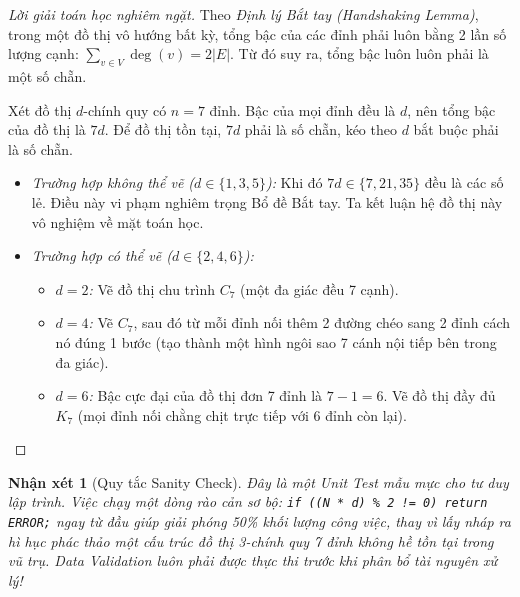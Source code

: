 \documentclass{article}
\newtheorem{nhanxet}{Nhận xét}
\begin{document}
\begin{proof}[Lời giải toán học nghiêm ngặt]
	Theo \emph{Định lý Bắt tay (Handshaking Lemma)}, trong một đồ thị vô hướng bất kỳ, tổng bậc của các đỉnh phải luôn bằng 2 lần số lượng cạnh: $\sum_{v\in V} \deg(v) = 2|E|$. Từ đó suy ra, tổng bậc luôn luôn phải là một số chẵn.
	
	Xét đồ thị $d$-chính quy có $n=7$ đỉnh. Bậc của mọi đỉnh đều là $d$, nên tổng bậc của đồ thị là $7d$. Để đồ thị tồn tại, $7d$ phải là số chẵn, kéo theo $d$ bắt buộc phải là số chẵn.
	\begin{itemize}
		\item \emph{Trường hợp không thể vẽ ($d \in \{1, 3, 5\}$):} Khi đó $7d \in \{7, 21, 35\}$ đều là các số lẻ. Điều này vi phạm nghiêm trọng Bổ đề Bắt tay. Ta kết luận hệ đồ thị này vô nghiệm về mặt toán học.
		\item \emph{Trường hợp có thể vẽ ($d \in \{2, 4, 6\}$):} 
		\begin{itemize}
			\item \emph{$d=2$:} Vẽ đồ thị chu trình $C_7$ (một đa giác đều 7 cạnh).
			\item \emph{$d=4$:} Vẽ $C_7$, sau đó từ mỗi đỉnh nối thêm 2 đường chéo sang 2 đỉnh cách nó đúng 1 bước (tạo thành một hình ngôi sao 7 cánh nội tiếp bên trong đa giác).
			\item \emph{$d=6$:} Bậc cực đại của đồ thị đơn 7 đỉnh là $7-1=6$. Vẽ đồ thị đầy đủ $K_7$ (mọi đỉnh nối chằng chịt trực tiếp với 6 đỉnh còn lại).
		\end{itemize}
	\end{itemize}
\end{proof}

\begin{nhanxet}[Quy tắc Sanity Check]
	Đây là một \emph{Unit Test} mẫu mực cho tư duy lập trình. Việc chạy một dòng rào cản sơ bộ: \texttt{if ((N * d) \% 2 != 0) return ERROR;} ngay từ đầu giúp giải phóng 50\% khối lượng công việc, thay vì lấy nháp ra hì hục phác thảo một cấu trúc đồ thị 3-chính quy 7 đỉnh không hề tồn tại trong vũ trụ. Data Validation luôn phải được thực thi trước khi phân bổ tài nguyên xử lý!
\end{nhanxet}
\end{document}
